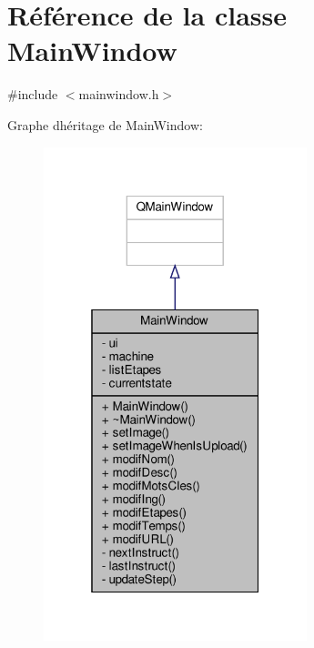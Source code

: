 \hypertarget{classMainWindow}{}\section{Référence de la classe Main\+Window}
\label{classMainWindow}


{\ttfamily \#include $<$mainwindow.\+h$>$}



Graphe d\textquotesingle{}héritage de Main\+Window\+:\nopagebreak
\begin{figure}[H]
\begin{center}
\leavevmode
\includegraphics[width=217pt]{classMainWindow__inherit__graph}
\end{center}
\end{figure}


